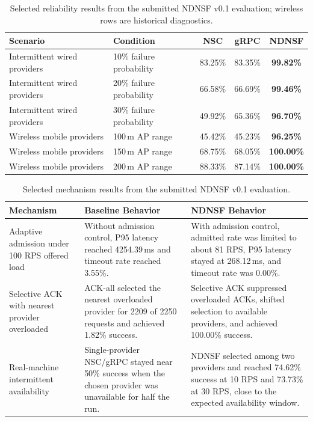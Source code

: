 \begin{table}[H]
\centering
\caption{Selected reliability results from the submitted NDNSF v0.1 evaluation; wireless rows are historical diagnostics.}
\label{tab:ndnsf-v01-reliability}
\begin{tabularx}{\textwidth}{p{}p{}ccc}
\toprule
Scenario & Condition & NSC & gRPC & NDNSF \\
\midrule
Intermittent wired providers & 10\% failure probability & 83.25\% & 83.35\% & \textbf{99.82\%} \\
Intermittent wired providers & 20\% failure probability & 66.58\% & 66.69\% & \textbf{99.46\%} \\
Intermittent wired providers & 30\% failure probability & 49.92\% & 65.36\% & \textbf{96.70\%} \\
Wireless mobile providers & 100\,m AP range & 45.42\% & 45.23\% & \textbf{96.25\%} \\
Wireless mobile providers & 150\,m AP range & 68.75\% & 68.05\% & \textbf{100.00\%} \\
Wireless mobile providers & 200\,m AP range & 88.33\% & 87.14\% & \textbf{100.00\%} \\
\bottomrule
\end{tabularx}
\end{table}

\begin{table}[H]
\centering
\caption{Selected mechanism results from the submitted NDNSF v0.1 evaluation.}
\label{tab:ndnsf-v01-mechanisms}
\begin{tabularx}{\textwidth}{p{}p{}X}
\toprule
Mechanism & Baseline Behavior & NDNSF Behavior \\
\midrule
Adaptive admission under 100 RPS offered load & Without admission control,
P95 latency reached 4254.39\,ms and timeout rate reached 3.55\%. & With
admission control, admitted rate was limited to about 81 RPS, P95 latency
stayed at 268.12\,ms, and timeout rate was 0.00\%. \\
Selective ACK with nearest provider overloaded & ACK-all selected the nearest
overloaded provider for 2209 of 2250 requests and achieved 1.82\% success. &
Selective ACK suppressed overloaded ACKs, shifted selection to available
providers, and achieved 100.00\% success. \\
Real-machine intermittent availability & Single-provider NSC/gRPC stayed near
50\% success when the chosen provider was unavailable for half the run. &
NDNSF selected among two providers and reached 74.62\% success at 10 RPS and
73.73\% at 30 RPS, close to the expected availability window. \\
\bottomrule
\end{tabularx}
\end{table}

